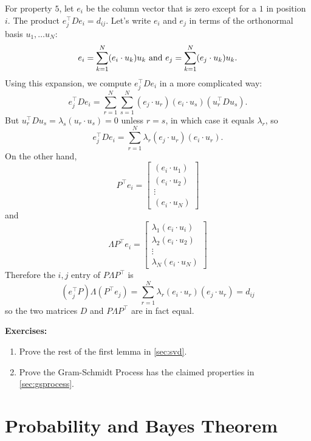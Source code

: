 \documentclass[
  oneside]{scrbook}
\begin{document}
For property \(5\), let \(e_{i}\) be the column vector that is zero
except for a \(1\) in position \(i\). The product
\(e_{j}^{\intercal}De_{i}=d_{ij}\). Let's write \(e_{i}\) and \(e_{j}\)
in terms of the orthonormal basis \(u_{1},\ldots u_{N}\): \[
e_{i} = \sum_{k=1}^{N} (e_{i}\cdot u_{k})u_k \hbox{ and } e_{j} = \sum_{k=1}^{N}(e_{j}\cdot u_{k})u_{k}.
\] Using this expansion, we compute \(e_{j}^{\intercal}De_{i}\) in a
more complicated way: \[
e_{j}^{\intercal}De_{i} = \sum_{r=1}^{N}\sum_{s=1}^{N} (e_{j}\cdot u_{r})(e_{i}\cdot u_{s})(u_{r}^{\intercal}Du_{s}).
\] But \(u_{r}^{\intercal}Du_{s}=\lambda_{s}(u_{r}\cdot u_{s})=0\)
unless \(r=s\), in which case it equals \(\lambda_{r}\), so \[
e_{j}^{\intercal}De_{i} = \sum_{r=1}^{N} \lambda_{r}(e_{j}\cdot u_{r})(e_{i}\cdot u_{r}).
\] On the other hand, \[
P^{\intercal}e_{i} = \left[\begin{matrix} (e_{i}\cdot u_{1})\\ (e_{i}\cdot u_{2})\\ \vdots \\(e_{i}\cdot u_{N})\end{matrix}\right]
\] and \[
\Lambda P^{\intercal}e_{i} = \left[\begin{matrix} \lambda_{1}(e_{i}\cdot u_{i})\\ \lambda_{2}(e_{i}\cdot u_{2})\\ \vdots \\ \lambda_{N}(e_{i}\cdot u_{N})\end{matrix}\right]
\] Therefore the \(i,j\) entry of \(P\Lambda P^{\intercal}\) is \[
(e_{j}^{\intercal}P)\Lambda (P^{\intercal}e_{j}) = \sum_{r=1}^{N} \lambda_{r}(e_{i}\cdot u_{r})(e_{j}\cdot u_{r}) = d_{ij}
\] so the two matrices \(D\) and \(P\Lambda P^{\intercal}\) are in fact
equal.

\textbf{Exercises:}

\begin{enumerate}
\def\labelenumi{\arabic{enumi}.}
\item
  Prove the rest of the first lemma in \cref{sec:svd}.
\item
  Prove the Gram-Schmidt Process has the claimed properties in
  \cref{sec:gsprocess}.
\end{enumerate}

\hypertarget{probability-and-bayes-theorem}{%
\chapter{Probability and Bayes
Theorem}\label{probability-and-bayes-theorem}}
\end{document}

